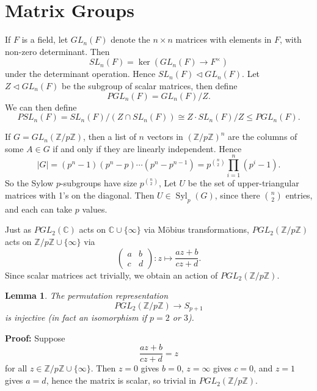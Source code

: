 \documentclass[12pt]{article}
\DeclareMathOperator{\Syl}{Syl}
\newtheorem{lemma}{Lemma}[section]
\theoremstyle{definition}
\theoremstyle{remark}
\begin{document}
\newpage

\section{Matrix Groups}%
\label{sec:matrix_groups}

If $F$ is a field, let $GL_n(F)$ denote the $n \times n$ matrices with elements in $F$, with non-zero determinant. Then
\[
	SL_n(F) = \ker(GL_n(F) \to F^{\times})
\]
under the determinant operation. Hence $SL_n(F) \lhd GL_n(F)$. Let $Z \lhd GL_n(F)$ be the subgroup of scalar matrices, then define
\[
	PGL_n(F) = GL_n(F) / Z
.\]
We can then define
\[
	PSL_n(F) = SL_n(F) / (Z \cap SL_n(F)) \cong Z \cdot SL_n(F) / Z \leq PGL_n(F)
.\]

If $G = GL_n(\mathbb{Z}/p \mathbb{Z})$, then a list of $n$ vectors in $(\mathbb{Z}/p \mathbb{Z})^{n}$ are the columns of some $A \in G$ if and only if they are linearly independent. Hence
\[
	|G| = (p^{n}-1)(p^{n} - p) \cdots (p^{n} - p^{n-1}) = p^{\binom{n}{2}} \prod_{i = 1}^{n} (p^{i} - 1)
.\]
So the Sylow $p$-subgroups have size $p^{\binom{n}{2}}$, Let $U$ be the set of upper-triangular matrices with 1's on the diagonal. Then $U \in \Syl_p(G)$, since there $\binom{n}{2}$ entries, and each can take $p$ values.

Just as $PGL_2(\mathbb{C})$ acts on $\mathbb{C} \cup \{\infty\}$ via M\"{o}bius transformations, $PGL_2(\mathbb{Z}/ p \mathbb{Z})$ acts on $\mathbb{Z} / p \mathbb{Z} \cup \{\infty\}$ via
\[
\begin{pmatrix}
	a & b \\
	c & d
\end{pmatrix}
: z \mapsto \frac{az + b}{cz + d}
.\]
Since scalar matrices act trivially, we obtain an action of $PGL_2(\mathbb{Z} / p \mathbb{Z})$.

\begin{lemma}
	The permutation representation
	\[
		PGL_2(\mathbb{Z} / p \mathbb{Z}) \to S_{p+1}
	\]
	is injective (in fact an isomorphism if $p = 2$ or $3$).
\end{lemma}

\begin{adjustbox}{minipage = \columnwidth - 25.5pt, margin=1em, frame=1pt, margin=0em}
\textbf{Proof:} Suppose
\[
\frac{az + b}{cz + d} = z
\]
for all $z \in \mathbb{Z} / p \mathbb{Z} \cup \{\infty\}$. Then $z = 0$ gives $b = 0$, $z = \infty$ gives $c = 0$, and $z = 1$ gives $a = d$, hence the matrix is scalar, so trivial in $PGL_2(\mathbb{Z} / p \mathbb{Z})$.
\end{adjustbox}
\end{document}
